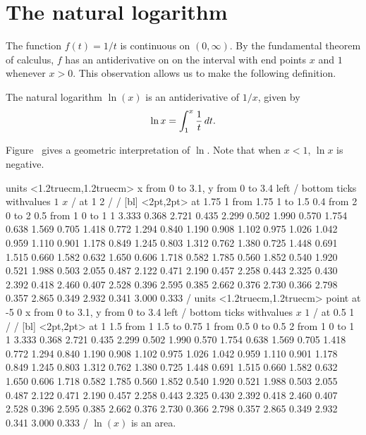 \section{The natural logarithm}{}{}
\nobreak
The function $f(t)=1/t$ is continuous on $(0, \infty ) $.
By the fundamental theorem of calculus, $f$ has an antiderivative on
on the interval with end points $x$ and $1$ whenever $x>0 $. This
observation allows us to make the following definition.

 The {\dfont natural logarithm} $\ln(x)$ is an antiderivative of
$1/x$, given by 
$$\ln x = \int _1 ^x {1\over t}\,dt.$$
\enddef

Figure~ gives a geometric interpretation of $\ln$.
Note that when $x<1$, $\ln x$ is negative.

\figure
\texonly
\vbox{\beginpicture
\normalgraphs
\ninepoint
\setcoordinatesystem units <1.2truecm,1.2truecm>
\setplotarea x from 0 to 3.1, y from 0 to 3.4
\axis left /
\axis bottom ticks withvalues {$1$} {$x$} / at 1 2 / /
 [bl] <2pt,2pt> at 1.75 1
\arrow <4pt> [0.35, 1] from 1.75 1 to 1.5 0.4
\putrule from 2 0 to 2 0.5
\putrule from 1 0 to 1 1
 3.333 0.368 2.721 0.435 2.299 0.502 1.990 0.570 1.754 
0.638 1.569 0.705 1.418 0.772 1.294 0.840 1.190 0.908 1.102 
0.975 1.026 1.042 0.959 1.110 0.901 1.178 0.849 1.245 0.803 
1.312 0.762 1.380 0.725 1.448 0.691 1.515 0.660 1.582 0.632 
1.650 0.606 1.718 0.582 1.785 0.560 1.852 0.540 1.920 0.521 
1.988 0.503 2.055 0.487 2.122 0.471 2.190 0.457 2.258 0.443 
2.325 0.430 2.392 0.418 2.460 0.407 2.528 0.396 2.595 0.385 
2.662 0.376 2.730 0.366 2.798 0.357 2.865 0.349 2.932 0.341 
3.000 0.333 /
\setcoordinatesystem units <1.2truecm,1.2truecm> point at -5 0
\setplotarea x from 0 to 3.1, y from 0 to 3.4
\axis left /
\axis bottom ticks withvalues {$x$} {$1$} / at 0.5 1 / /
 [bl] <2pt,2pt> at 1 1.5
\arrow <4pt> [0.35, 1] from 1 1.5 to 0.75 1
\putrule from 0.5 0 to 0.5 2
\putrule from 1 0 to 1 1
 3.333 0.368 2.721 0.435 2.299 0.502 1.990 0.570 1.754 
0.638 1.569 0.705 1.418 0.772 1.294 0.840 1.190 0.908 1.102 
0.975 1.026 1.042 0.959 1.110 0.901 1.178 0.849 1.245 0.803 
1.312 0.762 1.380 0.725 1.448 0.691 1.515 0.660 1.582 0.632 
1.650 0.606 1.718 0.582 1.785 0.560 1.852 0.540 1.920 0.521 
1.988 0.503 2.055 0.487 2.122 0.471 2.190 0.457 2.258 0.443 
2.325 0.430 2.392 0.418 2.460 0.407 2.528 0.396 2.595 0.385 
2.662 0.376 2.730 0.366 2.798 0.357 2.865 0.349 2.932 0.341 
3.000 0.333 /
\endpicture}
\endtexonly
{}
\begincaption
$\ln(x)$ is an area.
\endcaption
\endfigure

